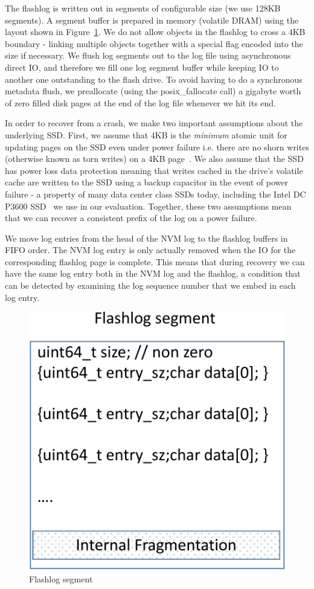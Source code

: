 \documentclass[pageno]{jpaper}
\begin{document}
The flashlog is written out in segments of configurable size (we use 128KB
segments). A segment buffer is prepared in memory (volatile DRAM) using the
layout shown in Figure~\ref{fig:flashlog_page}. We do not allow objects in the
flashlog to cross a 4KB boundary - linking multiple objects together with a
special flag encoded into the size if necessary. We flush log segments out to
the log file using asynchronous direct IO, and therefore we fill one log segment
buffer while keeping IO to another one outstanding to the flash drive. To avoid
having to do a synchronous metadata flush, we preallocate (using the
posix\_fallocate call) a gigabyte worth of zero filled disk pages at the end of
the log file whenever we hit its end.

In order to recover from a crash, we make two important assumptions about the
underlying SSD. First, we assume that 4KB is the \emph{minimum} atomic unit for
updating pages on the SSD even under power failure i.e. there are no shorn
writes (otherwise known as torn writes) on a 4KB page~\cite{shorn_writes}. We
also assume that the SSD has power loss data protection meaning that writes
cached in the drive's volatile cache are written to the SSD using a backup
capacitor in the event of power failure - a property of many data center class
SSDs today, including the Intel DC P3600 SSD~\cite{ssd_spec} we use in our
evaluation. Together, these two assumptions mean that we can recover a consistent
prefix of the log on a power failure.

We move log entries from the head of the NVM log to the flashlog buffers in FIFO
order. The NVM log entry is only actually removed when the IO for the
corresponding flashlog page is complete. This means that during recovery we can
have the same log entry both in the NVM log and the flashlog, a condition that
can be detected by examining the log sequence number that we embed in each log
entry.

\begin{figure}
  \centering
  \includegraphics[scale=0.4]{figures2/flashlog_page.pdf}
  \caption{Flashlog segment}
  \label{fig:flashlog_page}
\end{figure}
\end{document}
